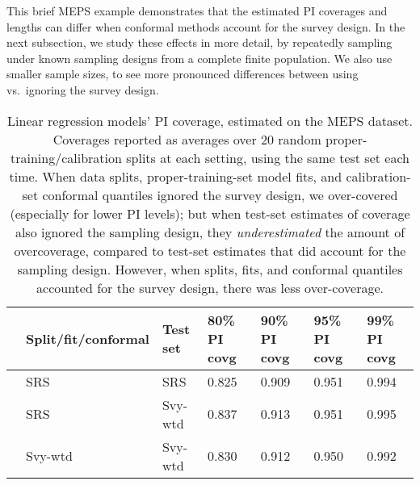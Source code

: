 \documentclass[10.5pt, letterpaper]{article}
\numberwithin{table}{section}
\numberwithin{figure}{section}
\numberwithin{equation}{section}
\begin{document}
This brief MEPS example demonstrates that the estimated PI coverages and lengths can differ when conformal methods account for the survey design. In the next subsection, we study these effects in more detail, by repeatedly sampling under known sampling designs from a complete finite population. We also use smaller sample sizes, to see more pronounced differences between using vs.\ ignoring the survey design.






\begin{table}[t!]
\centering
\begin{tabular}{rllllll}
  \hline
  & Split/fit/conformal & Test set & 80\% PI covg & 90\% PI covg  & 95\% PI covg & 99\% PI covg\\
  \hline
  & SRS & SRS & 0.825 & 0.909 & 0.951 & 0.994 \\
  & SRS & Svy-wtd & 0.837 & 0.913 & 0.951 & 0.995 \\
  & Svy-wtd & Svy-wtd & 0.830 & 0.912 & 0.950 & 0.992 \\
  \hline
\end{tabular}
\caption{Linear regression models' PI coverage, estimated on the MEPS dataset. Coverages reported as averages over 20 random proper-training/calibration splits at each setting, using the same test set each time. When data splits, proper-training-set model fits, and calibration-set conformal quantiles ignored the survey design, we over-covered (especially for lower PI levels); but when test-set estimates of coverage also ignored the sampling design, they \emph{underestimated} the amount of overcoverage, compared to test-set estimates that did account for the sampling design. However, when splits, fits, and conformal quantiles accounted for the survey design, there was less over-coverage.}
\label{table:meps_covg}
\end{table}
\end{document}
